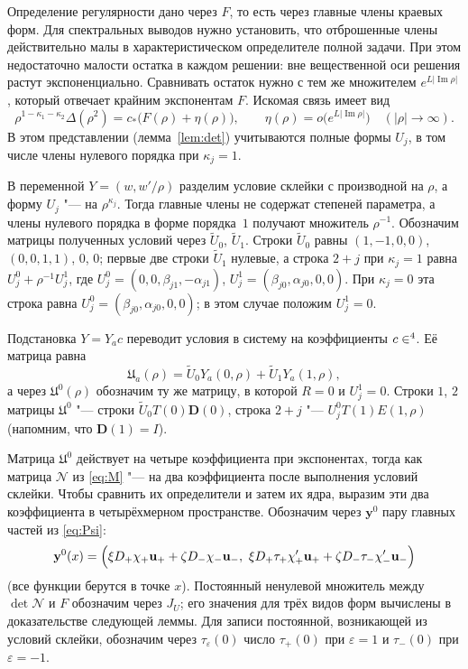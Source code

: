 \documentclass[12pt,a4paper]{article}
\numberwithin{equation}{section}
\theoremstyle{definition}
\let\C\relax\newcommand{\C}{\mathbb C}
\newcommand{\abs}[1]{\lvert#1\rvert}
\newcommand{\Imm}{\operatorname{Im}}
\newcommand{\Uf}{\mathfrak U}
\newcommand{\Mm}{\mathcal N}
\newcommand{\Dd}{\mathbf D}
\begin{document}
Определение регулярности дано через $F$, то есть через главные члены краевых форм.
Для спектральных выводов нужно установить, что отброшенные члены действительно
малы в характеристическом определителе полной задачи. При этом недостаточно
малости остатка в каждом решении: вне вещественной оси решения растут
экспоненциально. Сравнивать остаток нужно с тем же множителем
$e^{L\abs{\Imm\rho}}$, который отвечает крайним экспонентам $F$.
Искомая связь имеет вид
\[
 \rho^{1-\kappa_1-\kappa_2}\Delta(\rho^2)=c_\ast\bigl(F(\rho)+\eta(\rho)\bigr),\qquad
 \eta(\rho)=o\bigl(e^{L\abs{\Imm\rho}}\bigr)\quad(\abs\rho\to\infty).
\]
В этом представлении (лемма~\ref{lem:det}) учитываются полные формы $U_j$,
в том числе члены нулевого порядка при $\kappa_j=1$.

В переменной $Y=(w,w'/\rho)$ разделим условие склейки с производной на $\rho$,
а форму $U_j$ "--- на $\rho^{\kappa_j}$. Тогда главные члены не содержат степеней
параметра, а члены нулевого порядка в форме порядка~$1$ получают множитель
$\rho^{-1}$. Обозначим матрицы полученных условий через $\widetilde U_0$,
$\widetilde U_1$. Строки $\widetilde U_0$ равны $(1,-1,0,0)$,
$(0,0,1,1)$, $0$, $0$; первые две строки $\widetilde U_1$ нулевые,
а строка $2+j$ при $\kappa_j=1$ равна $U_j^0+\rho^{-1}U_j^1$, где
$U_j^0=(0,0,\beta_{j1},-\alpha_{j1})$,
$U_j^1=(\beta_{j0},\alpha_{j0},0,0)$.
При $\kappa_j=0$ эта строка равна $U_j^0=(\beta_{j0},\alpha_{j0},0,0)$;
в этом случае положим $U_j^1=0$.

Подстановка $Y=Y_a c$ переводит условия в систему на коэффициенты $c\in\C^4$.
Её матрица равна
\[
 \Uf_a(\rho)=\widetilde U_0Y_a(0,\rho)+\widetilde U_1Y_a(1,\rho),
\]
а через $\Uf^0(\rho)$ обозначим ту же матрицу, в которой $R=0$ и $U_j^1=0$. Строки $1$, $2$
матрицы $\Uf^0$ "--- строки $\widetilde U_0T(0)\Dd(0)$, строка $2+j$ "--- $U_j^0T(1)E(1,\rho)$
(напомним, что $\Dd(1)=I$).

Матрица $\Uf^0$ действует на четыре коэффициента при экспонентах, тогда как
матрица $\Mm$ из \eqref{eq:M} "--- на два коэффициента после выполнения условий
склейки. Чтобы сравнить их определители и затем их ядра, выразим эти два
коэффициента в четырёхмерном пространстве. Обозначим через $\mathbf y^0$
пару главных частей из \eqref{eq:Psi}:
\[
 \mathbf y^0(x)=\Bigl(
 \xi D_+\chi_+\mathbf u_++\zeta D_-\chi_-\mathbf u_-,\
 \xi D_+\tau_+\chi_+'\mathbf u_++\zeta D_-\tau_-\chi_-'\mathbf u_-\Bigr)
\]
(все функции берутся в точке $x$). Постоянный ненулевой множитель между
$\det\Mm$ и $F$ обозначим через $J_U$; его значения для трёх видов форм
вычислены в доказательстве следующей леммы.
Для записи постоянной, возникающей из условий склейки, обозначим через
$\tau_\varepsilon(0)$ число $\tau_+(0)$ при $\varepsilon=1$ и $\tau_-(0)$ при $\varepsilon=-1$.
\end{document}
